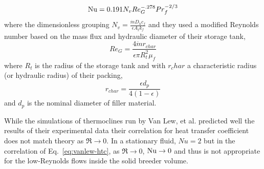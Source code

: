 

\begin{equation}\label{eq:vanlew-htc}
	\mathrm{Nu} =0.191 N_v Re_G^{-.278} Pr_f^{-2/3}
\end{equation}
where the dimensionless grouping $N_v = \frac{\dot{m}D_hc_f}{\epsilon A_tk_f}$ and they used a modified Reynolds number based on the mass flux and hydraulic diameter of their storage tank,
\begin{equation}
	Re_G=\frac{4 \dot{m} r_{char}}{\epsilon \pi R_t^2\mu_f}
\end{equation}
where $R_t$ is the radius of the storage tank and with $r_char$ a characteristic radius (or hydraulic radius) of their packing, 
\begin{equation}
	r_{char}=\frac{\epsilon d_p}{4(1-\epsilon)}
\end{equation}
and $d_p$ is the nominal diameter of filler material.

While the simulations of thermoclines run by Van Lew, et al. predicted well the results of their experimental data\cite{vanlew133,Valmiki2012a} their correlation for heat transfer coefficient does not match theory as $\Re \rightarrow 0$. In a stationary fluid, $Nu = 2$ but in the correlation of Eq.~\ref{eq:vanlew-htc}, as $\Re \rightarrow 0$, $\mathrm{Nu} \rightarrow0$ and thus is not appropriate for the low-Reynolds flows inside the solid breeder volume.








